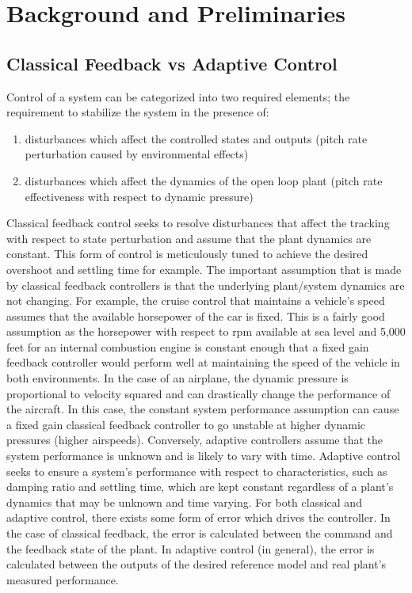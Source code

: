 \chapter{Background and Preliminaries}\label{ch:problem}

\section{Classical Feedback vs Adaptive Control}
Control of a system can be categorized into two required elements; the requirement to stabilize the system in the presence of:
\begin{enumerate}
 \item disturbances which affect the controlled states and outputs (pitch rate perturbation caused by environmental effects)
 \item disturbances which affect the dynamics of the open loop plant (pitch rate effectiveness with respect to dynamic pressure)
\end{enumerate}
Classical feedback control seeks to resolve disturbances that affect the tracking with respect to state perturbation and assume that the plant dynamics are constant.  This form of control is meticulously tuned to achieve the desired overshoot and settling time for example.  The important assumption that is made by classical feedback controllers is that the underlying plant/system dynamics are not changing.  For example, the cruise control that maintains a vehicle's speed assumes that the available horsepower of the car is fixed.  This is a fairly good assumption as the horsepower with respect to rpm available at sea level and 5,000 feet for an internal combustion engine is constant enough that a fixed gain feedback controller would perform well at maintaining the speed of the vehicle in both environments.  In the case of an airplane, the dynamic pressure is proportional to velocity squared and can drastically change the performance of the aircraft.  In this case, the constant system performance assumption can cause a fixed gain classical feedback controller to go unstable at higher dynamic pressures (higher airspeeds).   Conversely, adaptive controllers assume that the system performance is unknown and is likely to vary with time.  Adaptive control seeks to ensure a system's performance with respect to characteristics, such as damping ratio and settling time, which are kept constant regardless of a plant's dynamics that may be unknown and time varying.  For both classical and adaptive control, there exists some form of error which drives the controller.  In the case of classical feedback, the error is calculated between the command and the feedback state of the plant. In adaptive control (in general), the error is calculated between the outputs of the desired reference model and real plant's measured performance.

